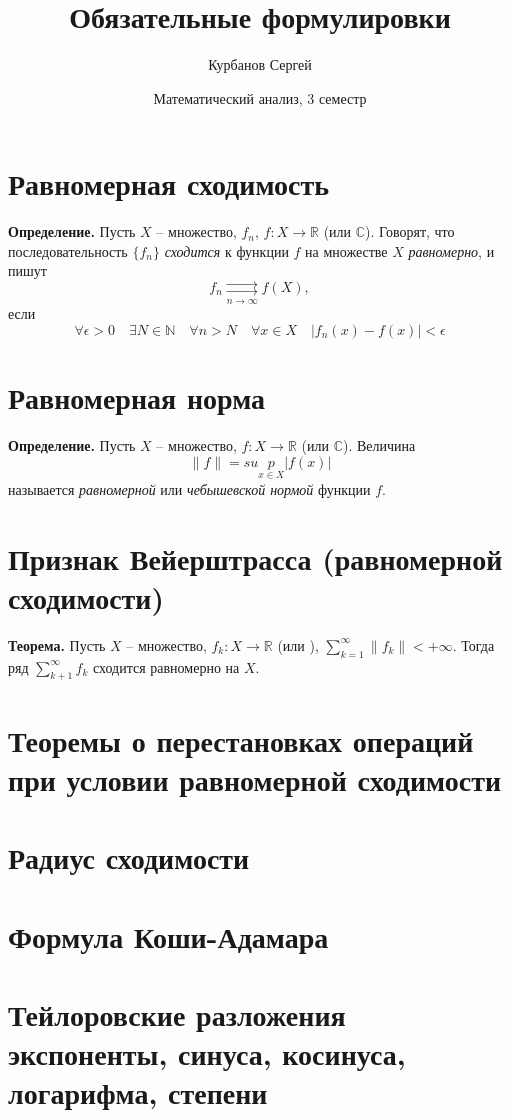 \documentclass[16pt, letterpaper]{article}
\title{Обязательные формулировки}
\author{Курбанов Сергей}
\date{Математический анализ, 3 семестр}
\begin{document}
\maketitle 

\section*{Равномерная сходимость}
\textbf{Определение.} Пусть $X$ -- множество, $f_n$, $f : X \rightarrow \mathbb{R}$ (или $\mathbb{C}$). Говорят, что последовательность $\{f_n\}$ \textit{сходится} к функции $f$ на множестве $X$ \textit{равномерно}, и пишут $$f_n \rightrightarrows\limits_{n \rightarrow \infty} f (X),$$ если $$\forall \epsilon > 0 \quad \exists N \in \mathbb{N} \quad \forall n > N \quad \forall x \in X \quad |f_n(x) - f(x)| < \epsilon$$

\section*{Равномерная норма}
\textbf{Определение.} Пусть $X$ -- множество, $f: X \to \mathbb{R}$ (или $\mathbb{C}$). Величина $$\|f\| = sup\limits_{x \in X} |f(x)|$$ называется \textit{равномерной} или \textit{чебышевской нормой} функции $f$.

\section*{Признак Вейерштрасса (равномерной сходимости)}
\textbf{Теорема.} Пусть $X$ -- множество, $f_k : X \to \mathbb{R}$ (или ), $\displaystyle\sum_{k = 1}^{\infty} \|f_k\| < + \infty$. Тогда ряд $\displaystyle\sum_{k + 1}^{\infty} f_k$ сходится равномерно на $X$. 

\section*{Теоремы о перестановках операций при условии равномерной сходимости}

\section*{Радиус сходимости}

\section*{Формула Коши-Адамара}

\section*{Тейлоровские разложения экспоненты, синуса, косинуса, логарифма, степени}
\end{document}

